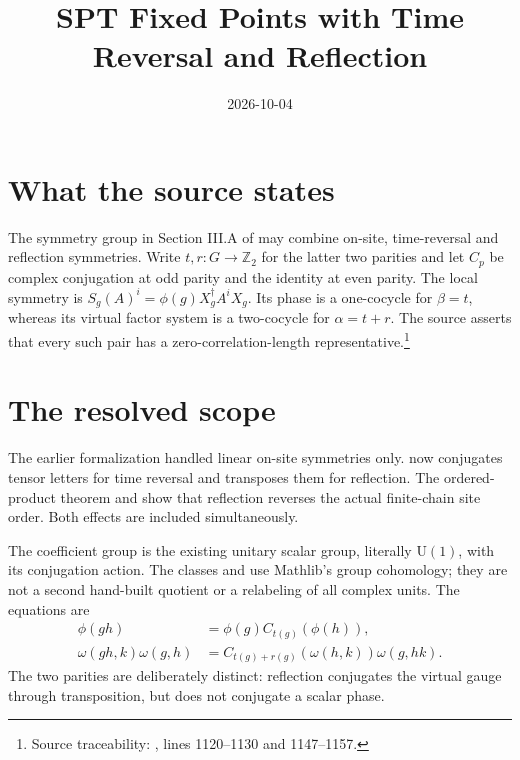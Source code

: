 \documentclass{article}
\title{SPT Fixed Points with Time Reversal and Reflection}
\author{}
\date{2026-10-04}
\begin{document}
\maketitle
{}

\section{What the source states}
The symmetry group in Section III.A of \cite{Cirac2021Matrix} may combine
on-site, time-reversal and reflection symmetries. Write $t,r:G\to\mathbb Z_2$
for the latter two parities and let $C_p$ be complex conjugation at odd
parity and the identity at even parity. The local symmetry is
$S_g(A)^i=\phi(g)X_g^\dagger A^iX_g$. Its phase is a one-cocycle for
$\beta=t$, whereas its virtual factor system is a two-cocycle for
$\alpha=t+r$. The source asserts that every such pair has a
zero-correlation-length representative.\footnote{Source traceability:
    , lines 1120--1130 and 1147--1157.}

\section{The resolved scope}
The earlier formalization handled linear on-site symmetries only.
 now conjugates tensor letters for time
reversal and transposes them for reflection. The ordered-product theorem
 and
 show that reflection reverses the
actual finite-chain site order. Both effects are included simultaneously.

The coefficient group is the existing unitary scalar group, literally
$\mathrm U(1)$, with its conjugation action. The classes
 and
 use Mathlib's group cohomology;
they are not a second hand-built quotient or a relabeling of all complex
units. The equations are
\begin{align}
    \phi(gh) & =\phi(g)C_{t(g)}(\phi(h)),               \\
    \omega(gh,k)\omega(g,h)
             & =C_{t(g)+r(g)}(\omega(h,k))\omega(g,hk).
\end{align}
The two parities are deliberately distinct: reflection conjugates the
virtual gauge through transposition, but does not conjugate a scalar phase.
\end{document}
